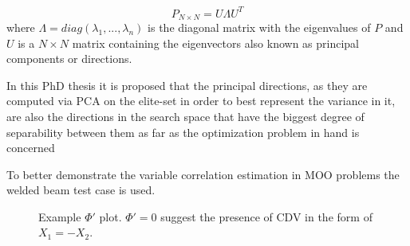\begin{equation} 
   P_{N\times N}= U\Lambda U^T
   \label{spectral}
\end{equation}
where $\Lambda\!=\!diag(\lambda_1 , . . . , \lambda_n )$ is the diagonal matrix with the eigenvalues of $P$ and $U$ is a $N\!\times\!N$ matrix containing the eigenvectors also known as principal components or directions. 

In this PhD thesis it is proposed that the principal directions, as they are computed via PCA on the elite-set in order to best represent the variance in it, are also the directions in the search space that have the biggest degree of separability between them as far as the optimization problem in hand is concerned 

To better demonstrate the variable correlation estimation in MOO problems  the welded beam test case is used.  

\begin{figure}[h!]
\begin{minipage}[b]{1\linewidth}
 \centering
\end{minipage}
\caption{Example $\Phi'$ plot. $\Phi' = 0$ suggest the presence of CDV in the form of $X_1=-X_2$.} 
\label{reco1}
\end{figure}



